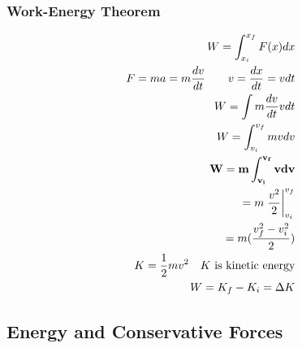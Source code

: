 \documentclass[12pt]{article}
\theoremstyle{break}
\numberwithin{theorem}{subsection}
\numberwithin{lemma}{subsection}
\numberwithin{corollary}{subsection}
\numberwithin{equation}{subsection}
\begin{document}
\subsubsection{Work-Energy Theorem}
\begin{align*}
W = \int_{x_i}^{x_f} F(x) dx \\
F = ma = m \frac{dv}{dt} \qquad v = \frac{dx}{dt} = vdt \\
W = \int m \frac{dv}{dt} v dt \\
W = \int_{v_i}^{v_f} m v dv  \\
{\bf W = m \int_{v_i}^{v_f} v dv} \\
= m \left. \frac{v^2}{2} \right|_{v_i}^{v_f} \\
= m (\frac{v_f^2 - v_i^2}{2}) \\
K = \frac12 mv^2 \quad \text{$K$ is kinetic energy} \\
W = K_f - K_i = \Delta K
\end{align*}

\subsection{Energy and Conservative Forces}
\end{document}

